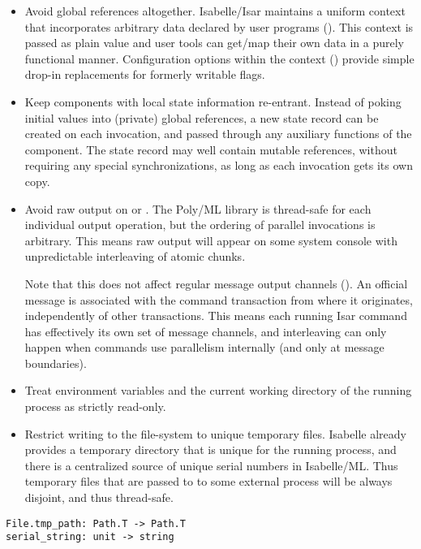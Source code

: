 \begin{isabellebody}
\begin{isamarkuptext}
\begin{itemize}
  \item Avoid global references altogether.  Isabelle/Isar maintains a
  uniform context that incorporates arbitrary data declared by user
  programs ().  This context is passed as
  plain value and user tools can get/map their own data in a purely
  functional manner.  Configuration options within the context
  () provide simple drop-in replacements
  for formerly writable flags.

  \item Keep components with local state information re-entrant.
  Instead of poking initial values into (private) global references, a
  new state record can be created on each invocation, and passed
  through any auxiliary functions of the component.  The state record
  may well contain mutable references, without requiring any special
  synchronizations, as long as each invocation gets its own copy.

  \item Avoid raw output on  or .  The
  Poly/ML library is thread-safe for each individual output operation,
  but the ordering of parallel invocations is arbitrary.  This means
  raw output will appear on some system console with unpredictable
  interleaving of atomic chunks.

  Note that this does not affect regular message output channels
  ().  An official message is associated
  with the command transaction from where it originates, independently
  of other transactions.  This means each running Isar command has
  effectively its own set of message channels, and interleaving can
  only happen when commands use parallelism internally (and only at
  message boundaries).

  \item Treat environment variables and the current working directory
  of the running process as strictly read-only.

  \item Restrict writing to the file-system to unique temporary files.
  Isabelle already provides a temporary directory that is unique for
  the running process, and there is a centralized source of unique
  serial numbers in Isabelle/ML.  Thus temporary files that are passed
  to to some external process will be always disjoint, and thus
  thread-safe.

  \end{itemize}%
\end{isamarkuptext}%
\isamarkuptrue%
%
\isadelimmlref
%
\endisadelimmlref
%
\isatagmlref
%
\begin{isamarkuptext}%
\begin{mldecls}
  \verb|File.tmp_path: Path.T -> Path.T| \\
  \verb|serial_string: unit -> string| \\
  \end{mldecls}


\end{isamarkuptext}
\end{isabellebody}
